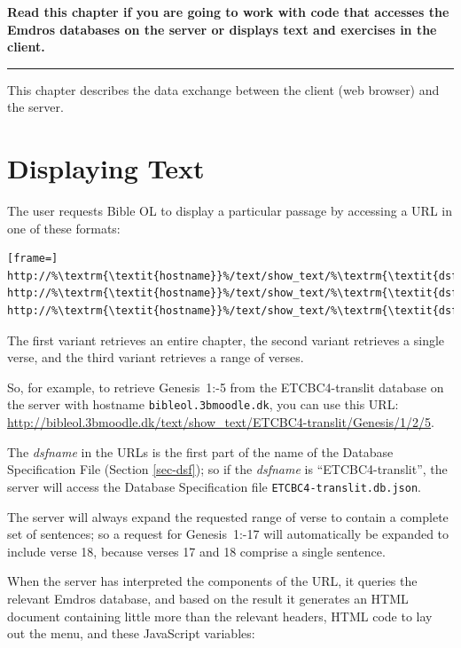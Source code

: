 \documentclass[11pt,oneside,a4paper]{memoir}
\newcommand*{\bibleref}[3]{#1~#2\thinspace:\thinspace#3}
\begin{document}
\textbf{Read this chapter if you are going to work with code that accesses the Emdros databases on
  the server or displays text and exercises in the client.}
\plainbreak{3}

This chapter describes the data exchange between the client (web browser) and the server.

\section{Displaying Text}\label{displaying-text}

The user requests Bible OL to display a particular passage by accessing a URL in one of these formats:

\begin{lstlisting}[frame=]
http://%\textrm{\textit{hostname}}%/text/show_text/%\textrm{\textit{dsfname}}%/%\textrm{\textit{book}}%/%\textrm{\textit{chapter}}%
http://%\textrm{\textit{hostname}}%/text/show_text/%\textrm{\textit{dsfname}}%/%\textrm{\textit{book}}%/%\textrm{\textit{chapter}}%/%\textrm{\textit{verse}}%
http://%\textrm{\textit{hostname}}%/text/show_text/%\textrm{\textit{dsfname}}%/%\textrm{\textit{book}}%/%\textrm{\textit{chapter}}%/%\textrm{\textit{firstverse}}%/%\textrm{\textit{lastverse}}%
\end{lstlisting}

The first variant retrieves an entire chapter, the second variant retrieves a single verse, and the
third variant retrieves a range of verses.

So, for example, to retrieve \bibleref{Genesis}{1}{2-5} from the ETCBC4-translit database on the
server with hostname \texttt{bibleol.3bmoodle.dk}, you can use this URL:
\url{http://bibleol.3bmoodle.dk/text/show_text/ETCBC4-translit/Genesis/1/2/5}.

The \emph{dsfname} in the URLs is the first part of the name of the Database Specification File
(Section \ref{sec-dsf}); so if the \emph{dsfname} is ``ETCBC4-translit'', the server will access the
Database Specification file \texttt{ETCBC4-translit.db.json}.

The server will always expand the requested range of verse to contain a complete set of sentences;
so a request for \bibleref{Genesis}{1}{16-17} will automatically be expanded to include verse 18,
because verses 17 and 18 comprise a single sentence.

When the server has interpreted the components of the URL, it queries the relevant Emdros database,
and based on the result it generates an HTML document containing little more than the relevant
headers, HTML code to lay out the menu, and these JavaScript variables:
\end{document}
